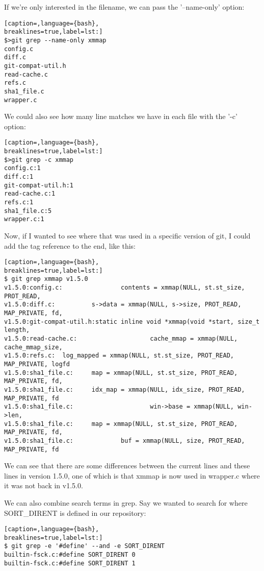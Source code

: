 If we're only interested in the filename, we can pass the '--name-only' option:
\lstset{basicstyle=\scriptsize, numbers=none, captionpos=b, tabsize=4}
\begin{lstlisting}[caption=,language={bash},
breaklines=true,label=lst:]
$>git grep --name-only xmmap
config.c
diff.c
git-compat-util.h
read-cache.c
refs.c
sha1_file.c
wrapper.c
\end{lstlisting}

We could also see how many line matches we have in each file with the '-c'
option:
\lstset{basicstyle=\scriptsize, numbers=none, captionpos=b, tabsize=4}
\begin{lstlisting}[caption=,language={bash},
breaklines=true,label=lst:]
$>git grep -c xmmap
config.c:1
diff.c:1
git-compat-util.h:1
read-cache.c:1
refs.c:1
sha1_file.c:5
wrapper.c:1
\end{lstlisting}

Now, if I wanted to see where that was used in a specific version of git, I
could add the tag reference to the end, like this:
\lstset{basicstyle=\scriptsize, numbers=none, captionpos=b, tabsize=4}
\begin{lstlisting}[caption=,language={bash},
breaklines=true,label=lst:]
$ git grep xmmap v1.5.0
v1.5.0:config.c:                contents = xmmap(NULL, st.st_size, PROT_READ,
v1.5.0:diff.c:          s->data = xmmap(NULL, s->size, PROT_READ, MAP_PRIVATE, fd,
v1.5.0:git-compat-util.h:static inline void *xmmap(void *start, size_t length,
v1.5.0:read-cache.c:                    cache_mmap = xmmap(NULL, cache_mmap_size, 
v1.5.0:refs.c:  log_mapped = xmmap(NULL, st.st_size, PROT_READ, MAP_PRIVATE, logfd
v1.5.0:sha1_file.c:     map = xmmap(NULL, st.st_size, PROT_READ, MAP_PRIVATE, fd, 
v1.5.0:sha1_file.c:     idx_map = xmmap(NULL, idx_size, PROT_READ, MAP_PRIVATE, fd
v1.5.0:sha1_file.c:                     win->base = xmmap(NULL, win->len,
v1.5.0:sha1_file.c:     map = xmmap(NULL, st.st_size, PROT_READ, MAP_PRIVATE, fd, 
v1.5.0:sha1_file.c:             buf = xmmap(NULL, size, PROT_READ, MAP_PRIVATE, fd
\end{lstlisting}

We can see that there are some differences between the current lines and these
lines in version 1.5.0, one of which is that xmmap is now used in wrapper.c
where it was not back in v1.5.0.

We can also combine search terms in grep. Say we wanted to search for where
SORT\_DIRENT is defined in our repository:
\lstset{basicstyle=\scriptsize, numbers=none, captionpos=b, tabsize=4}
\begin{lstlisting}[caption=,language={bash},
breaklines=true,label=lst:]
$ git grep -e '#define' --and -e SORT_DIRENT
builtin-fsck.c:#define SORT_DIRENT 0
builtin-fsck.c:#define SORT_DIRENT 1
\end{lstlisting}

